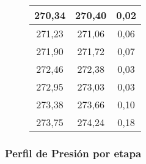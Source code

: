 \begin{figure}[H]
\begin{tabular}{|c|c|c|}
        \hline
        270,34          & 270,40         & 0,02                         \\
        \hline
        271,23          & 271,06         & 0,06                         \\
        \hline
        271,90          & 271,72         & 0,07                         \\
        \hline
        272,46          & 272,38         & 0,03                         \\
        \hline
        272,95          & 273,03         & 0,03                         \\
        \hline
        273,38          & 273,66         & 0,10                         \\
        \hline
        273,75          & 274,24         & 0,18                         \\
        \hline
    \end{tabular}
    \normalsize
\end{figure}

\newpage

\subsubsection{Perfil de Presión por etapa}


